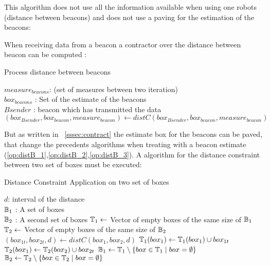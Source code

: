 This algorithm does not use all the information available when using one robots (distance between beacons) and does not use a paving for the estimation of the beacons:

When receiving data from a beacon a contractor over the distance between beacon can be computed :

\begin{algorithm}[H]
\caption{Process distance between beacons }
\label{alg:distBetBeaconsSlam}
\begin{algorithmic}[1]
\REQUIRE $measure_{beacons}$: (set of measures between two iteration)\\
   $box_{beacons}$ : Set of the estimate of the beacons\\
   $Bsender$ : beacon which has transmitted the data   
\label{op:distB_3}
\STATE $(box_{Bsender},box_{beacon},measure_{beacon}) \leftarrow distC(box_{Bsender},box_{beacon},measure_{beacon})$
\ENDFOR
\end{algorithmic}
\end{algorithm}

But as written in ~\ref{sssec:contract} the estimate box for the beacons can be paved, that change the precedents 
algorithms when treating with a beacon estimate (\ref{op:distB_1},\ref{op:distB_2},\ref{op:distB_3}). A algorithm for the distance constraint between two set of boxes must be executed:

\begin{algorithm}[H]
\caption{Distance Constraint Application on two set of boxes }
\label{alg:distTwoSet}
\begin{algorithmic}[1]
\REQUIRE $d$: interval of the distance\\
   $\mathbb{B_{\textnormal{1}}}$ : A set of boxes\\
   $\mathbb{B_{\textnormal{2}}}$ : A second set of boxes
\STATE $\mathbb{T_{\textnormal{1}}} \leftarrow$ Vector of empty boxes of the same size of $\mathbb{B_{\textnormal{1}}}$
\STATE $\mathbb{T_{\textnormal{2}}} \leftarrow$ Vector of empty boxes of the same size of $\mathbb{B_{\textnormal{2}}}$
\STATE $(box_{1t},box_{2t},d) \leftarrow distC(box_1,box_2,d)$
\STATE $\mathbb{T_{\textnormal{1}}}(box_1) \leftarrow \mathbb{T_{\textnormal{1}}}(box_1)  \cup box_{1t}$
\STATE $\mathbb{T_{\textnormal{2}}}(box_1) \leftarrow \mathbb{T_{\textnormal{2}}}(box_2)  \cup box_{2t}$
\ENDFOR
\ENDFOR
\STATE $\mathbb{B_{\textnormal{1}}} \leftarrow \mathbb{T_{\textnormal{1}}}\setminus\{box \in \mathbb{T_{\textnormal{1}}} \mid box = \emptyset \}$
\STATE $\mathbb{B_{\textnormal{2}}} \leftarrow \mathbb{T_{\textnormal{2}}}\setminus\{box \in \mathbb{T_{\textnormal{2}}} \mid box = \emptyset \}$
\end{algorithmic}
\end{algorithm}

